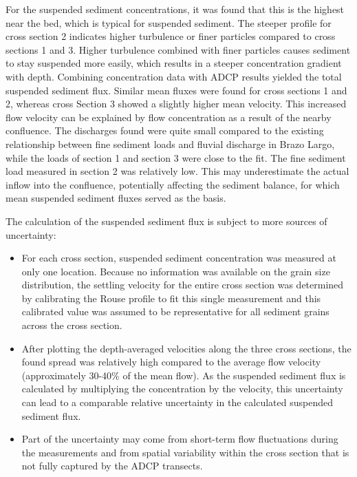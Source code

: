 For the suspended sediment concentrations, it was found that this is the highest near the bed, which is typical for suspended sediment. The steeper profile for cross section 2 indicates higher turbulence or finer particles compared to cross sections 1 and 3. Higher turbulence combined with finer particles causes sediment to stay suspended more easily, which results in a steeper concentration gradient with depth. Combining concentration data with ADCP results yielded the total suspended sediment flux. Similar mean fluxes were found for cross sections 1 and 2, whereas cross Section 3 showed a slightly higher mean velocity. This increased flow velocity can be explained by flow concentration as a result of the nearby confluence. The discharges found were quite small compared to the existing relationship between fine sediment loads and fluvial discharge in Brazo Largo, while the loads of section 1 and section 3 were close to the fit. The fine sediment load measured in section 2 was relatively low. This may underestimate the actual inflow into the confluence, potentially affecting the sediment balance, for which mean suspended sediment fluxes served as the basis.

The calculation of the suspended sediment flux is subject to more sources of uncertainty:
\begin{itemize}
    \item For each cross section, suspended sediment concentration was measured at only one location. Because no information was available on the grain size distribution, the settling velocity for the entire cross section was determined by calibrating the Rouse profile to fit this single measurement and this calibrated value was assumed to be representative for all sediment grains across the cross section.
    \item After plotting the depth-averaged velocities along the three cross sections, the found spread was relatively high compared to the average flow velocity (approximately  30-40\% of the mean flow). As the suspended sediment flux is calculated by multiplying the concentration by the velocity, this uncertainty can lead to a comparable relative uncertainty in the calculated suspended sediment flux.
    \item Part of the uncertainty may come from short-term flow fluctuations during the measurements and from spatial variability within the cross section that is not fully captured by the ADCP transects. 
\end{itemize}

